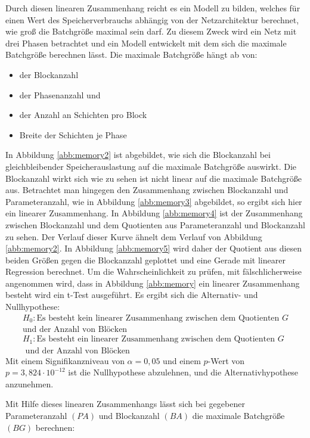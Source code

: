 Durch diesen linearen Zusammenhang reicht es ein Modell zu bilden, welches für einen Wert des Speicherverbrauchs abhängig von der Netzarchitektur berechnet, wie groß die Batchgröße maximal sein darf. Zu diesem Zweck wird ein Netz mit drei Phasen betrachtet und ein Modell entwickelt mit dem sich die maximale Batchgröße berechnen lässt. Die maximale Batchgröße hängt ab von:

\begin{itemize}
 \item der Blockanzahl
 \item der Phasenanzahl und
 \item der Anzahl an Schichten pro Block
 \item Breite der Schichten je Phase
\end{itemize}
In Abbildung \ref{abb:memory2} ist abgebildet, wie sich die Blockanzahl bei gleichbleibender Speicherauslastung auf die maximale Batchgröße auswirkt. Die Blockanzahl wirkt sich wie zu sehen ist nicht linear auf die maximale Batchgröße aus. Betrachtet man hingegen den Zusammenhang zwischen Blockanzahl und Parameteranzahl, wie in Abbildung \ref{abb:memory3} abgebildet, so ergibt sich hier ein linearer Zusammenhang. In Abbildung \ref{abb:memory4} ist der Zusammenhang zwischen Blockanzahl und dem Quotienten aus Parameteranzahl und Blockanzahl zu sehen. Der Verlauf dieser Kurve ähnelt dem Verlauf von Abbildung \ref{abb:memory2}. In Abbildung \ref{abb:memory5} wird daher der Quotient aus diesen beiden Größen gegen die Blockanzahl geplottet und eine Gerade mit linearer Regression berechnet.
Um die Wahrscheinlichkeit zu prüfen, mit fälschlicherweise angenommen wird, dass in Abbildung \ref{abb:memory} ein linearer Zusammenhang besteht wird ein t-Test ausgeführt.
Es ergibt sich die Alternativ- und Nullhypothese:
\begin{align*}
 H_0: \text{Es besteht kein linearer Zusammenhang zwischen dem Quotienten } G \\
 \text{und der Anzahl von Blöcken} \\
 H_1: \text{Es besteht ein linearer Zusammenhang zwischen dem Quotienten } G \\ 
 \text{ und der Anzahl von Blöcken}
\end{align*}
Mit einem Signifikanzniveau von $\alpha =0,05$ und einem $p$-Wert von $p=3,824 \cdot 10^{-12}$ ist die Nullhypothese abzulehnen, und die Alternativhypothese anzunehmen. 

Mit Hilfe dieses linearen Zusammenhangs lässt sich bei gegebener Parameteranzahl $(PA)$ und Blockanzahl $(BA)$ die maximale Batchgröße $(BG)$ berechnen:

